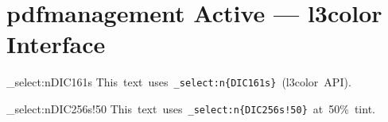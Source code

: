 \documentclass{article}\listfiles\pagestyle{empty}
\newcommand\onelineskip{\par\vspace{\baselineskip}\par}
\begin{document}
\section{pdfmanagement Active --- l3color Interface}

\begingroup
\ExplSyntaxOn
\color_select:n{DIC161s}
This~text~uses~\texttt{\string\color_select:n\{DIC161s\}}~(l3color~API).
\ExplSyntaxOff
\endgroup

\onelineskip

\begingroup
\ExplSyntaxOn
\color_select:n{DIC256s!50}
This~text~uses~\texttt{\string\color_select:n\{DIC256s!50\}}~at~50\%~tint.
\ExplSyntaxOff
\endgroup
\end{document}
